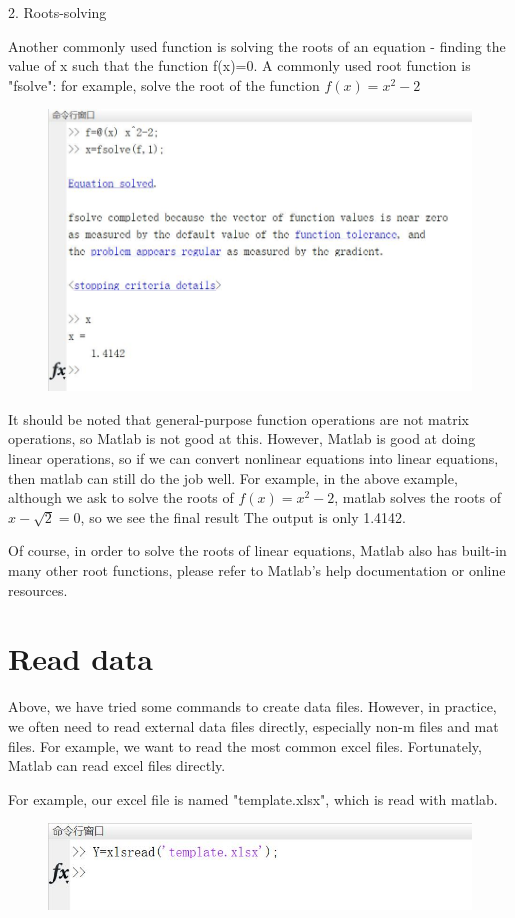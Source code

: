 \documentclass[10pt,math=newtx,citestyle=gb7714-2015,bibstyle=gb7714-2015]{elegantbook}
\begin{document}
{{{	2. Roots-solving 
	
	Another commonly used function is solving the roots of an equation - finding the value of x such that the function f(x)=0. A commonly used root function is "fsolve": for example, solve the root of the function $f(x)=x^2-2$	
	\begin{figure}[htbp!]
		\centering
		\includegraphics[width=0.8\linewidth]{FIG/fsolve}
		\centering
	\end{figure}
	
	It should be noted that general-purpose function operations are not matrix operations, so Matlab is not good at this. However, Matlab is good at doing linear operations, so if we can convert nonlinear equations into linear equations, then matlab can still do the job well. For example, in the above example, although we ask to solve the roots of $f(x)=x^2-2$, matlab solves the roots of $x-\sqrt{2}=0$, so we see the final result The output is only 1.4142.
	
	Of course, in order to solve the roots of linear equations, Matlab also has built-in many other root functions, please refer to Matlab's help documentation or online resources.
	
	\section{Read data}
	
	Above, we have tried some commands to create data files. However, in practice, we often need to read external data files directly, especially non-m files and mat files. For example, we want to read the most common excel files. Fortunately, Matlab can read excel files directly.
	
	For example, our excel file is named "template.xlsx", which is read with matlab.
	
	\begin{figure}[htbp!]
		\centering
		\includegraphics[width=0.8\linewidth]{FIG/excel}
		\centering
	\end{figure}
	
}}}
\end{document}
